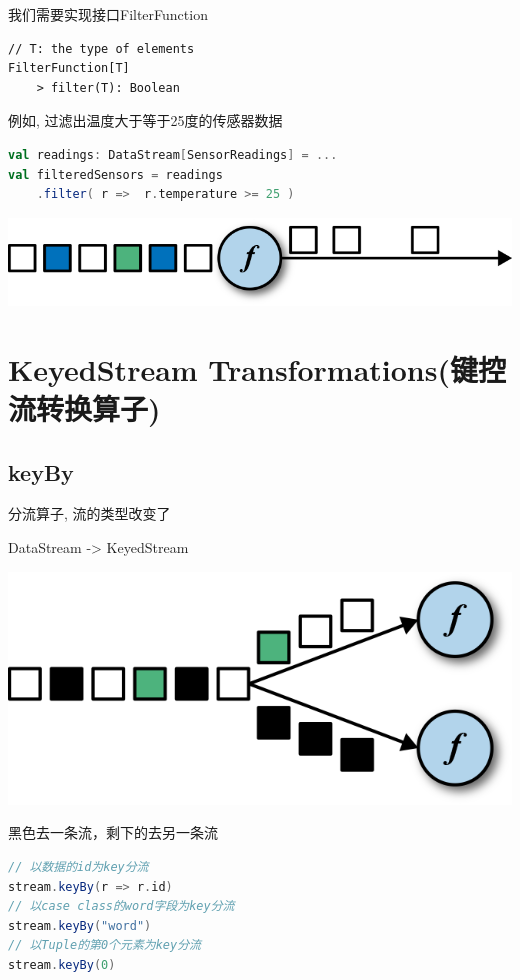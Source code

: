 \documentclass[oneside]{ctexbook}
\begin{document}
我们需要实现接口\colorbox{gray!20}{FilterFunction}

\begin{lstlisting}
// T: the type of elements
FilterFunction[T]
    > filter(T): Boolean
\end{lstlisting}

例如, 过滤出温度大于等于25度的传感器数据

\begin{lstlisting}[language=scala, breaklines]
val readings: DataStream[SensorReadings] = ...
val filteredSensors = readings
    .filter( r =>  r.temperature >= 25 )
\end{lstlisting}

\noindent \includegraphics[width=\textwidth]{filter.png}

\section{KeyedStream Transformations(键控流转换算子)}

\subsection{keyBy}

分流算子, 流的类型改变了

DataStream -> KeyedStream

\noindent \includegraphics[width=\textwidth]{keyby.png}

黑色去一条流，剩下的去另一条流

\begin{lstlisting}[language=scala, breaklines]
// 以数据的id为key分流
stream.keyBy(r => r.id)
// 以case class的word字段为key分流
stream.keyBy("word")
// 以Tuple的第0个元素为key分流
stream.keyBy(0)
\end{lstlisting}
\end{document}

